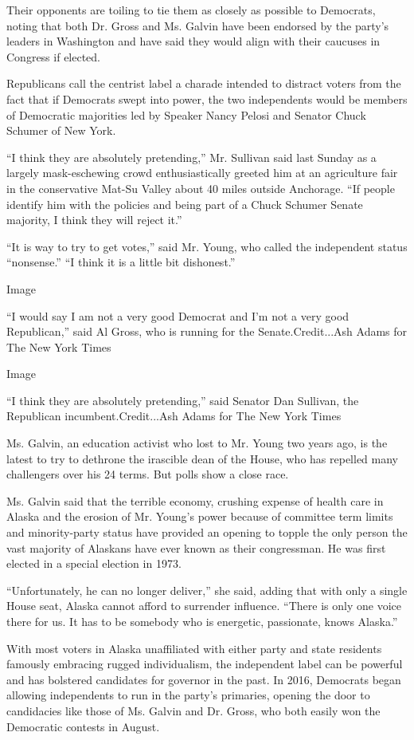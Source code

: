 Their opponents are toiling to tie them as closely as possible to
Democrats, noting that both Dr. Gross and Ms. Galvin have been endorsed
by the party's leaders in Washington and have said they would align with
their caucuses in Congress if elected.

Republicans call the centrist label a charade intended to distract
voters from the fact that if Democrats swept into power, the two
independents would be members of Democratic majorities led by Speaker
Nancy Pelosi and Senator Chuck Schumer of New York.

``I think they are absolutely pretending,'' Mr. Sullivan said last
Sunday as a largely mask-eschewing crowd enthusiastically greeted him at
an agriculture fair in the conservative Mat-Su Valley about 40 miles
outside Anchorage. ``If people identify him with the policies and being
part of a Chuck Schumer Senate majority, I think they will reject it.''

``It is way to try to get votes,'' said Mr. Young, who called the
independent status ``nonsense.'' ``I think it is a little bit
dishonest.''

Image

``I would say I am not a very good Democrat and I'm not a very good
Republican,'' said Al Gross, who is running for the Senate.Credit...Ash
Adams for The New York Times

Image

``I think they are absolutely pretending,'' said Senator Dan Sullivan,
the Republican incumbent.Credit...Ash Adams for The New York Times

Ms. Galvin, an education activist who lost to Mr. Young two years ago,
is the latest to try to dethrone the irascible dean of the House, who
has repelled many challengers over his 24 terms. But polls show a close
race.

Ms. Galvin said that the terrible economy, crushing expense of health
care in Alaska and the erosion of Mr. Young's power because of committee
term limits and minority-party status have provided an opening to topple
the only person the vast majority of Alaskans have ever known as their
congressman. He was first elected in a special election in 1973.

``Unfortunately, he can no longer deliver,'' she said, adding that with
only a single House seat, Alaska cannot afford to surrender influence.
``There is only one voice there for us. It has to be somebody who is
energetic, passionate, knows Alaska.''

With most voters in Alaska unaffiliated with either party and state
residents famously embracing rugged individualism, the independent label
can be powerful and has bolstered candidates for governor in the past.
In 2016, Democrats began allowing independents to run in the party's
primaries, opening the door to candidacies like those of Ms. Galvin and
Dr. Gross, who both easily won the Democratic contests in August.

